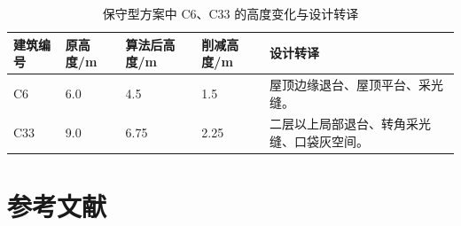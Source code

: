 \documentclass[UTF8,zihao=-4,a4paper]{ctexart}
\begin{document}
\begin{table}[H]
\centering
\caption{保守型方案中 C6、C33 的高度变化与设计转译}
\small
\begin{tabular}{p{}p{}p{}p{}p{}}
\toprule
建筑编号 & 原高度/m & 算法后高度/m & 削减高度/m & 设计转译 \\
\midrule
C6 & 6.0 & 4.5 & 1.5 & 屋顶边缘退台、屋顶平台、采光缝。\\
C33 & 9.0 & 6.75 & 2.25 & 二层以上局部退台、转角采光缝、口袋灰空间。\\
\bottomrule
\end{tabular}
\end{table}

\section{参考文献}
\end{document}
